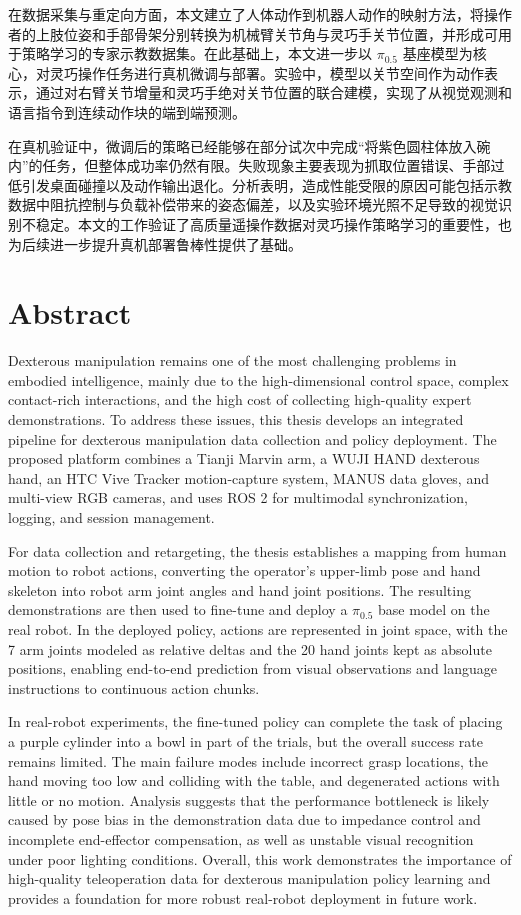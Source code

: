 在数据采集与重定向方面，本文建立了人体动作到机器人动作的映射方法，将操作者的上肢位姿和手部骨架分别转换为机械臂关节角与灵巧手关节位置，并形成可用于策略学习的专家示教数据集。在此基础上，本文进一步以 $\pi_{0.5}$ 基座模型为核心，对灵巧操作任务进行真机微调与部署。实验中，模型以关节空间作为动作表示，通过对右臂关节增量和灵巧手绝对关节位置的联合建模，实现了从视觉观测和语言指令到连续动作块的端到端预测。

在真机验证中，微调后的策略已经能够在部分试次中完成“将紫色圆柱体放入碗内”的任务，但整体成功率仍然有限。失败现象主要表现为抓取位置错误、手部过低引发桌面碰撞以及动作输出退化。分析表明，造成性能受限的原因可能包括示教数据中阻抗控制与负载补偿带来的姿态偏差，以及实验环境光照不足导致的视觉识别不稳定。本文的工作验证了高质量遥操作数据对灵巧操作策略学习的重要性，也为后续进一步提升真机部署鲁棒性提供了基础。

\chapter*{Abstract}%

Dexterous manipulation remains one of the most challenging problems in embodied intelligence, mainly due to the high-dimensional control space, complex contact-rich interactions, and the high cost of collecting high-quality expert demonstrations. To address these issues, this thesis develops an integrated pipeline for dexterous manipulation data collection and policy deployment. The proposed platform combines a Tianji Marvin arm, a WUJI HAND dexterous hand, an HTC Vive Tracker motion-capture system, MANUS data gloves, and multi-view RGB cameras, and uses ROS 2 for multimodal synchronization, logging, and session management.

For data collection and retargeting, the thesis establishes a mapping from human motion to robot actions, converting the operator's upper-limb pose and hand skeleton into robot arm joint angles and hand joint positions. The resulting demonstrations are then used to fine-tune and deploy a $\pi_{0.5}$ base model on the real robot. In the deployed policy, actions are represented in joint space, with the 7 arm joints modeled as relative deltas and the 20 hand joints kept as absolute positions, enabling end-to-end prediction from visual observations and language instructions to continuous action chunks.

In real-robot experiments, the fine-tuned policy can complete the task of placing a purple cylinder into a bowl in part of the trials, but the overall success rate remains limited. The main failure modes include incorrect grasp locations, the hand moving too low and colliding with the table, and degenerated actions with little or no motion. Analysis suggests that the performance bottleneck is likely caused by pose bias in the demonstration data due to impedance control and incomplete end-effector compensation, as well as unstable visual recognition under poor lighting conditions. Overall, this work demonstrates the importance of high-quality teleoperation data for dexterous manipulation policy learning and provides a foundation for more robust real-robot deployment in future work.

